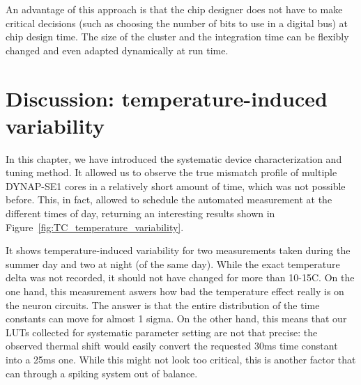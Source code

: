 An advantage of this approach is that the chip designer does not have to make critical decisions (such as choosing the number of bits to use in a digital bus) at chip design time. The size of the cluster and the integration time can be flexibly changed and even adapted dynamically at run time. 






\section{Discussion: temperature-induced variability}

In this chapter, we have introduced the systematic device characterization and tuning method. It allowed us to observe the true mismatch profile of multiple DYNAP-SE1 cores in a relatively short amount of time, which was not possible before. This, in fact, allowed to schedule the automated measurement at the different times of day, returning an interesting results shown in Figure~\ref{fig:TC_temperature_variability}.

It shows temperature-induced variability for two measurements taken during the summer day and two at night (of the same day). While the exact temperature delta was not recorded, it should not have changed for more than 10-15C. On the one hand, this measurement aswers how bad the temperature effect really is on the neuron circuits. The answer is that the entire distribution of the time constants can move for almost 1 sigma. On the other hand, this means that our LUTs collected for systematic parameter setting are not that precise: the observed thermal shift would easily convert the requested 30ms time constant into a 25ms one. While this might not look too critical, this is another factor that can through a spiking system out of balance.

